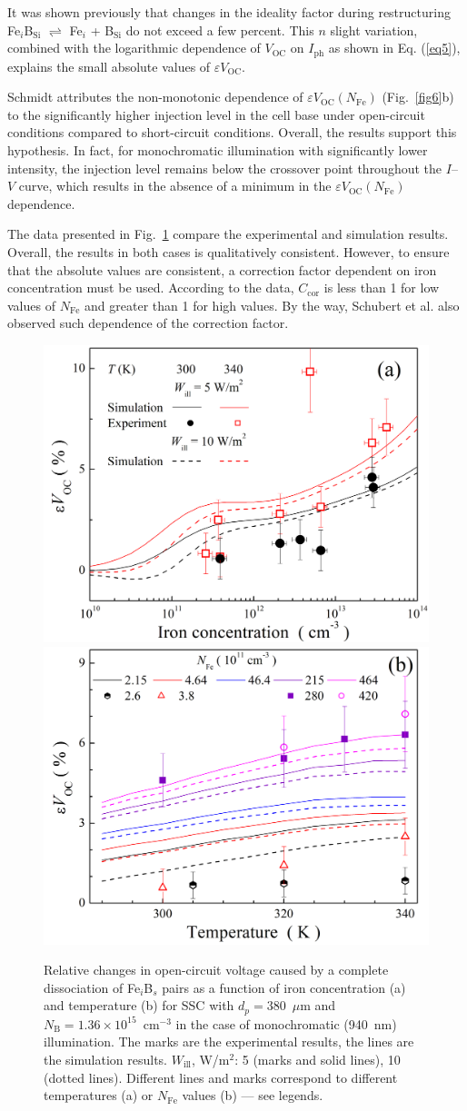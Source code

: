 \documentclass[a4paper,fleqn]{cas-sc}
\begin{document}
It was shown \cite{Olikh2022PPV,Olikh2019SM} previously
that changes in the ideality factor during restructuring Fe$_i$B$_\mathrm{Si}$ $\rightleftharpoons$ Fe$_i$ + B$_\mathrm{Si}$ do not exceed a few percent.
This $n$ slight variation, combined with the logarithmic dependence of $V_\mathrm{OC}$ on $I_\mathrm{ph}$ as shown in Eq. (\ref{eq5}),
explains the small absolute values of $\varepsilon V_\mathrm{OC}$.

Schmidt \cite{FeB:Schmidt} attributes the non-monotonic dependence of $\varepsilon V_\mathrm{OC}\left(N_\mathrm{Fe}\right)$
(Fig.~\ref{fig6}b) to the significantly higher injection level in the cell base under open-circuit conditions
compared to short-circuit conditions.
Overall, the results support this hypothesis.
In fact,
for monochromatic illumination with significantly lower intensity,
the injection level remains below the crossover point \cite{FeB:Schmidt} throughout the $I$--$V$ curve,
which results in the absence of a minimum in the $\varepsilon V_\mathrm{OC}\left(N_\mathrm{Fe}\right)$ dependence.

The data presented in Fig.~\ref{fig7} compare the experimental and simulation results.
Overall, the results in both cases is qualitatively consistent.
However, to ensure that the absolute values are consistent, a correction factor dependent on iron concentration must be used.
According to the data, $C_\mathrm{cor}$ is less than 1 for low values of $N_\mathrm{Fe}$ and greater than 1 for high values.
By the way, Schubert et al. \cite{IronSC} also observed such dependence of the correction factor.

\begin{figure}
	\centering
     \includegraphics[width=0.4\linewidth]{Fig7a.png}
     \includegraphics[width=0.4\linewidth]{Fig7b.png}
	  \caption{Relative changes in open-circuit voltage caused by a complete
       dissociation of Fe$_i$B$_s$ pairs as a function of iron concentration (a) and
       temperature (b) for SSC with $d_p=380$~$\mu$m and $N_\mathrm{B}=1.36\times10^{15}$~cm$^{-3}$
       in the case of monochromatic (940~nm) illumination.
       The marks are the experimental results, the lines are the simulation results.
       $W_\mathrm{ill}$, W/m$^{2}$: 5 (marks and solid lines), 10 (dotted lines).
       Different lines and marks correspond to different temperatures (a) or $N_\mathrm{Fe}$ values (b) --- see legends.
}\label{fig7}
\end{figure}
\end{document}
